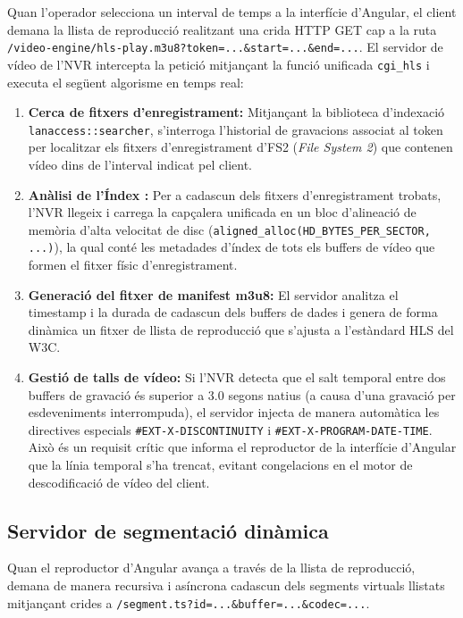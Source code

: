 Quan l'operador selecciona un interval de temps a la interfície d'Angular, el client demana la llista de reproducció realitzant una crida HTTP GET cap a la ruta \texttt{/video-engine/hls-play.\allowbreak{}m3u8?token=...\allowbreak{}\&start=...\allowbreak{}\&end=...}. El servidor de vídeo de l'NVR intercepta la petició mitjançant la funció unificada \texttt{cgi\_hls} i executa el següent algorisme en temps real:
\begin{enumerate}
  \item \textbf{Cerca de fitxers d'enregistrament:} Mitjançant la biblioteca d'indexació \texttt{lanaccess::searcher}, s'interroga l'historial de gravacions associat al token per localitzar els fitxers d'enregistrament d'FS2 (\textit{File System 2}) que contenen vídeo dins de l'interval indicat pel client.
  \item {\sloppy\textbf{Anàlisi de l'Índex :} Per a cadascun dels fitxers d'enregistrament trobats, l'NVR llegeix i carrega la capçalera unificada en un bloc d'alineació de memòria d'alta velocitat de disc (\texttt{aligned\_alloc(\allowbreak{}HD\_BYTES\_PER\_SECTOR,\allowbreak{} ...)}), la qual conté les metadades d'índex de tots els buffers de vídeo que formen el fitxer físic d'enregistrament.\par}
  \item \textbf{Generació del fitxer de manifest m3u8:} El servidor analitza el timestamp i la durada de cadascun dels buffers de dades i genera de forma dinàmica un fitxer de llista de reproducció que s'ajusta a l'estàndard HLS del W3C.
  \item \textbf{Gestió de talls de vídeo:} Si l'NVR detecta que el salt temporal entre dos buffers de gravació és superior a 3.0 segons natius (a causa d'una gravació per esdeveniments interrompuda), el servidor injecta de manera automàtica les directives especials \texttt{\#EXT-X-DISCONTINUITY} i \texttt{\#EXT-X-PROGRAM-DATE-TIME}. Això és un requisit crític que informa el reproductor de la interfície d'Angular que la línia temporal s'ha trencat, evitant congelacions en el motor de descodificació de vídeo del client.
\end{enumerate}

\subsection{Servidor de segmentació dinàmica}
Quan el reproductor d'Angular avança a través de la llista de reproducció, demana de manera recursiva i asíncrona cadascun dels segments virtuals llistats mitjançant crides a \texttt{/segment.ts?id=...\&buffer=...\&codec=...}.


